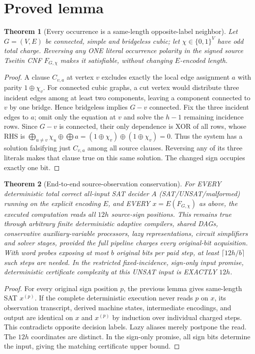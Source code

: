 \documentclass[11pt]{article}
\newtheorem{theorem}{Theorem}
\begin{document}
\section*{Proved lemma}
\begin{theorem}[Every occurrence is a same-length opposite-label neighbor]
Let $G=(V,E)$ be connected, simple and bridgeless cubic; let $\chi\in\{0,1\}^V$ have odd total charge. Reversing any ONE literal occurrence polarity in the signed source Tseitin CNF $F_{G,\chi}$ makes it satisfiable, without changing $E$-encoded length.
\end{theorem}
\begin{proof}
A clause $C_{v,a}$ at vertex $v$ excludes exactly the local edge assignment $a$ with parity $1\oplus\chi_v$. For connected cubic graphs, a cut vertex would distribute three incident edges among at least two components, leaving a component connected to $v$ by one bridge. Hence bridgeless implies $G-v$ connected. Fix the three incident edges to $a$; omit only the equation at $v$ and solve the $h-1$ remaining incidence rows. Since $G-v$ is connected, their only dependence is XOR of all rows, whose RHS is
$\bigoplus_{u\ne v}\chi_u\oplus\bigoplus a=(1\oplus\chi_v)\oplus(1\oplus\chi_v)=0$.
Thus the system has a solution falsifying just $C_{v,a}$ among all source clauses. Reversing any of its three literals makes that clause true on this same solution. The changed sign occupies exactly one bit.
\end{proof}
\begin{theorem}[End-to-end source-observation conservation]
For EVERY deterministic total correct all-input SAT decider $A$ (SAT/UNSAT/malformed) running on the explicit encoding $E$, and EVERY $x=E(F_{G,\chi})$ as above, the executed computation reads all $12h$ source-sign positions. This remains true through arbitrary finite deterministic adaptive compilers, shared DAGs, conservative auxiliary-variable processors, lazy representations, circuit simplifiers and solver stages, provided the full pipeline charges every original-bit acquisition. With word probes exposing at most $b$ original bits per paid step, at least $\lceil12h/b\rceil$ such steps are needed. In the restricted fixed-incidence, sign-only input promise, deterministic certificate complexity at this UNSAT input is EXACTLY $12h$.
\end{theorem}
\begin{proof}
For every original sign position $p$, the previous lemma gives same-length SAT $x^{(p)}$. If the complete deterministic execution never reads $p$ on $x$, its observation transcript, derived machine states, intermediate encodings, and output are identical on $x$ and $x^{(p)}$ by induction over individual charged steps. This contradicts opposite decision labels. Lazy aliases merely postpone the read. The $12h$ coordinates are distinct. In the sign-only promise, all sign bits determine the input, giving the matching certificate upper bound.
\end{proof}
\end{document}
